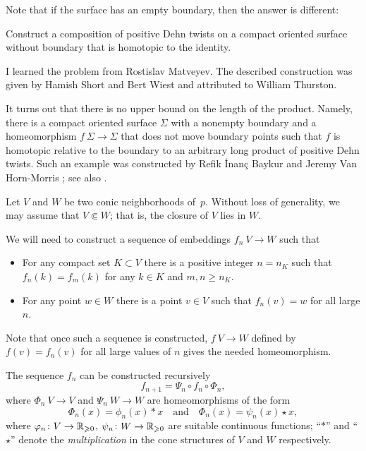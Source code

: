 Note that if the surface has an empty boundary, then the answer is different:

\begin{pr}
Construct a composition of positive Dehn twists on a compact oriented surface without boundary that is homotopic to the identity. 
\end{pr}

I learned the problem from Rostislav Matveyev.
The described construction was given by Hamish Short and Bert Wiest \cite{short-wiest} and attributed to William Thurston.

It turns out that there is no upper bound on the length of the product.
Namely, there is a compact oriented surface $\Sigma$ with a nonempty boundary and a homeomorphism $f\:\Sigma\to \Sigma$ that does not move boundary points such that $f$ is homotopic relative to the boundary to an arbitrary long product of positive Dehn twists.
Such an example was constructed by Refik İnanç Baykur and Jeremy Van Horn-Morris \cite{baykur-vanhornmorris};
see also \cite{baykur-monden-vanhornmorris}.

Let $V$ and $W$ be two conic neighborhoods of~$p$.
Without loss of generality, we may assume that $V\Subset W$;
that is, the closure of $V$ lies in $W$.

We will need to construct a sequence of embeddings $f_n\:V\to W$
such that 
\begin{itemize}
\item 
For any compact set $K\subset V$ 
there is a positive integer $n=n_K$ such that 
$f_n(k)=f_m(k)$ for any $k\in K$ and $m, n \ge n_K$.
\item For any point $w\in W$ there is a point $v\in V$ such that $f_n(v)=w$ for all large $n$.
\end{itemize}

Note that once such a sequence is constructed, $f\:V\to W$ defined by $f(v)=f_n(v)$ for all large values of $n$ gives the needed homeomorphism.

The sequence $f_n$ can be constructed recursively
\[f_{n+1}=\Psi_n\circ f_n\circ \Phi_n,\]
where $\Phi_n\:V\to V$ 
and $\Psi_n\:W\to W$ 
are homeomorphisms
of the form 
\[\Phi_n(x)=\phi_n(x)\ast x\quad \text{and}\quad \Phi_n(x)=\psi_n(x)\star x,\]
where $\varphi_n\colon V\to \mathbb{R}_{\geqslant 0}$, $\psi_n\colon W\to \mathbb{R}_{\geqslant 0}$ are suitable continuous functions;
``$\ast$'' and ``$\star$'' denote the {}\emph{multiplication} in the cone structures of $V$ and $W$ respectively.\qeds


